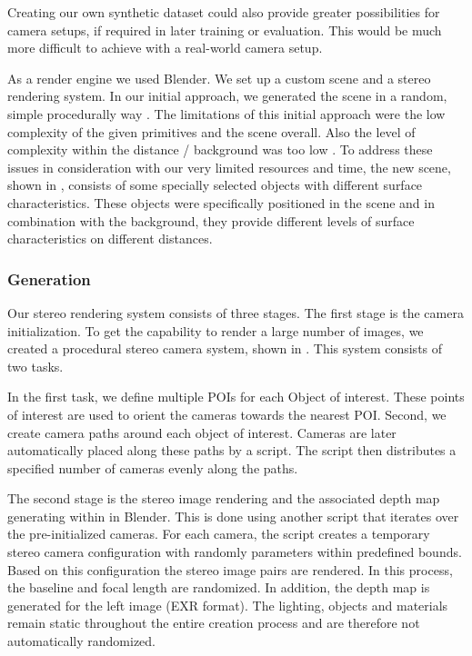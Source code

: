 Creating our own synthetic dataset could also provide greater possibilities for camera setups, if required in later training or evaluation. This would be much more difficult to achieve with a real-world camera setup.

As a render engine we used Blender. We set up a custom scene and a stereo rendering system. In our initial approach, we generated the scene in a random, simple procedurally way . The limitations of this initial approach were the low complexity of the given primitives and the scene overall. Also the level of complexity within the distance / background was too low \citep{yan2026makesgoodsynthetictraining}. To address these issues in consideration with our very limited resources and time, the new scene, shown in , consists of some specially selected objects with different surface characteristics. These objects were specifically positioned in the scene and in combination with the background, they provide different levels of surface characteristics on different distances.

\subsubsection{Generation}\label{dataset-generation}
Our stereo rendering system consists of three stages. The first stage is the camera initialization. To get the capability to render a large number of images, we created a procedural stereo camera system, shown in . This system consists of two tasks.

In the first task, we define multiple POIs for each Object of interest. These points of interest are used to orient the cameras towards the nearest POI. Second, we create camera paths around each object of interest. Cameras are later automatically placed along these paths by a script. The script then distributes a specified number of cameras evenly along the paths.

The second stage is the stereo image rendering and the associated depth map generating within in Blender. This is done using another script that iterates over the pre-initialized cameras. For each camera, the script creates a temporary stereo camera configuration with randomly parameters within predefined bounds. Based on this configuration the stereo image pairs are rendered. In this process, the baseline and focal length are randomized. In addition, the depth map is generated for the left image (EXR format). The lighting, objects and materials remain static throughout the entire creation process and are therefore not automatically randomized.

